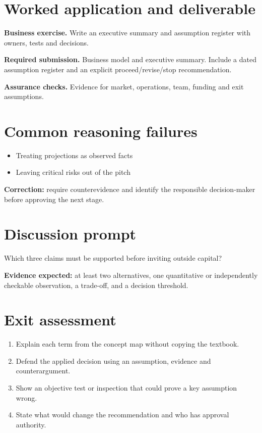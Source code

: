 \documentclass[11pt,letterpaper]{article}
\begin{document}
\section{Worked application and deliverable}
\textbf{Business exercise.} Write an executive summary and assumption register with owners, tests and decisions.\par\textbf{Required submission.} Business model and executive summary. Include a dated assumption register and an explicit proceed/revise/stop recommendation.\par\textbf{Assurance checks.} Evidence for market, operations, team, funding and exit assumptions.
\section{Common reasoning failures}
\begin{itemize}[leftmargin=*,itemsep=3pt]
\item Treating projections as observed facts
\item Leaving critical risks out of the pitch
\end{itemize}
\noindent\textbf{Correction:} require counterevidence and identify the responsible decision-maker before approving the next stage.
\section{Discussion prompt}
Which three claims must be supported before inviting outside capital?\par\medskip\textbf{Evidence expected:} at least two alternatives, one quantitative or independently checkable observation, a trade-off, and a decision threshold.
\section{Exit assessment}
\begin{enumerate}[leftmargin=*,itemsep=5pt]
\item Explain each term from the concept map without copying the textbook.
\item Defend the applied decision using an assumption, evidence and counterargument.
\item Show an objective test or inspection that could prove a key assumption wrong.
\item State what would change the recommendation and who has approval authority.
\end{enumerate}

\end{document}
